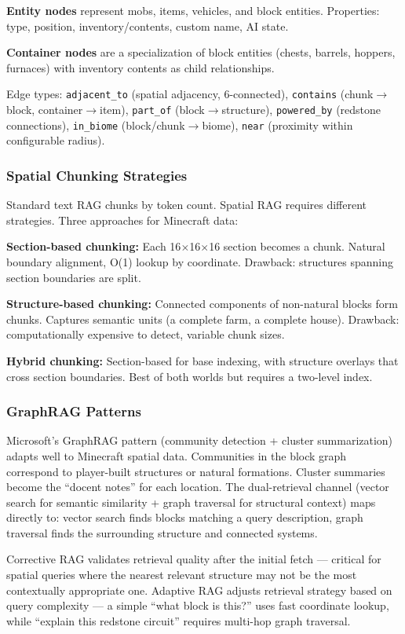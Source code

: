 \documentclass[11pt,letterpaper]{article}
\begin{document}
\textbf{Entity nodes} represent mobs, items, vehicles, and block entities. Properties: type, position, inventory/contents, custom name, AI state.

\textbf{Container nodes} are a specialization of block entities (chests, barrels, hoppers, furnaces) with inventory contents as child relationships.

Edge types: \texttt{adjacent\_to} (spatial adjacency, 6-connected), \texttt{contains} (chunk$\rightarrow$block, container$\rightarrow$item), \texttt{part\_of} (block$\rightarrow$structure), \texttt{powered\_by} (redstone connections), \texttt{in\_biome} (block/chunk$\rightarrow$biome), \texttt{near} (proximity within configurable radius).

\subsubsection{Spatial Chunking Strategies}
Standard text RAG chunks by token count. Spatial RAG requires different strategies. Three approaches for Minecraft data:

\textbf{Section-based chunking:} Each 16$\times$16$\times$16 section becomes a chunk. Natural boundary alignment, O(1) lookup by coordinate. Drawback: structures spanning section boundaries are split.

\textbf{Structure-based chunking:} Connected components of non-natural blocks form chunks. Captures semantic units (a complete farm, a complete house). Drawback: computationally expensive to detect, variable chunk sizes.

\textbf{Hybrid chunking:} Section-based for base indexing, with structure overlays that cross section boundaries. Best of both worlds but requires a two-level index.

\subsubsection{GraphRAG Patterns}
Microsoft's GraphRAG pattern (community detection + cluster summarization) adapts well to Minecraft spatial data. Communities in the block graph correspond to player-built structures or natural formations. Cluster summaries become the ``docent notes'' for each location. The dual-retrieval channel (vector search for semantic similarity + graph traversal for structural context) maps directly to: vector search finds blocks matching a query description, graph traversal finds the surrounding structure and connected systems.

Corrective RAG validates retrieval quality after the initial fetch --- critical for spatial queries where the nearest relevant structure may not be the most contextually appropriate one. Adaptive RAG adjusts retrieval strategy based on query complexity --- a simple ``what block is this?'' uses fast coordinate lookup, while ``explain this redstone circuit'' requires multi-hop graph traversal.
\end{document}
